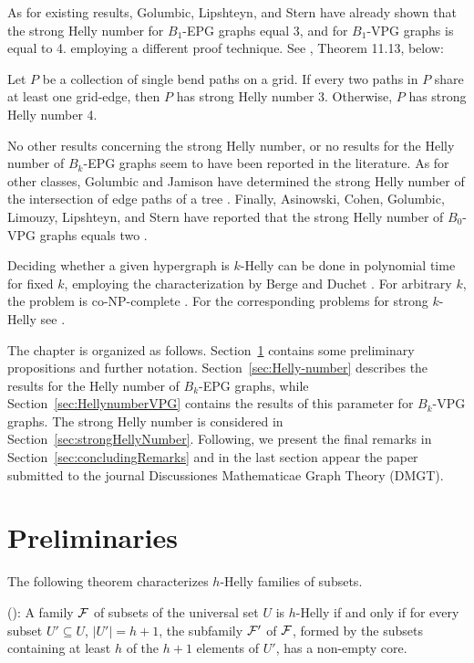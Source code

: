 As for existing results, 
Golumbic, Lipshteyn, and Stern \cite{golumbic2009}  have already shown that the strong Helly number for $B_1$-EPG graphs equal 3, and for $B_1$-VPG graphs is equal to 4. employing a different proof technique. See  \cite{chung201950}, Theorem 11.13, below:
\begin{theorem}\label{thm:chung201950}{\cite{chung201950}}
Let $P$ be a collection of single bend paths on a grid. If every two paths in $P$ share at least one grid-edge, then $P$ has strong Helly number 3. Otherwise, $P$ has strong Helly number 4.
\end{theorem}
No other results concerning the strong Helly number, or no results for the Helly number of $B_k$-EPG graphs seem to have been reported in the literature. As for other classes, Golumbic and Jamison have determined the strong Helly number of the intersection of edge paths of a tree \cite{golumbic1985}. Finally, Asinowski, Cohen, Golumbic, Limouzy, Lipshteyn, and Stern have reported that the strong Helly number of $B_0$-VPG graphs equals two \cite{asinowski2011string}.  

Deciding whether a given hypergraph is $k$-Helly can be done in polynomial time for fixed $k$, employing the characterization by Berge and Duchet \cite{bergeDuchet1975}. For arbitrary $k$, the problem is co-NP-complete \cite{dourado2009}. For the corresponding problems for strong $k$-Helly see \cite{dourado2008strong,dourado2009}.

The chapter is organized as follows. Section~\ref{sec:preliminares4} contains some preliminary propositions and further notation. Section~\ref{sec:Helly-number} describes the results for the Helly number of $B_k$-EPG graphs, while Section~\ref{sec:HellynumberVPG} contains the results of this parameter for $B_k$-VPG graphs. The strong Helly number is considered in Section~\ref{sec:strongHellyNumber}. Following, we present the final remarks in Section~\ref{sec:concludingRemarks} and in the last section appear the paper submitted to the journal Discussiones Mathematicae Graph Theory (DMGT).




\section{Preliminaries}\label{sec:preliminares4}

The following theorem characterizes $h$-Helly families of subsets.


\begin{theorem}\label{thm:BD}(\cite{bergeDuchet1975}):
A family $\cal{F}$  of subsets of the universal set $U$ is $h$-Helly if and only if for every subset $U' \subseteq U$, $|U'|= h+1$, the subfamily $\cal{F'}$ of $\cal{F}$, formed by the subsets containing at least $h$ of the $h+1$ elements of $U'$, has a non-empty core. 
\end{theorem}

